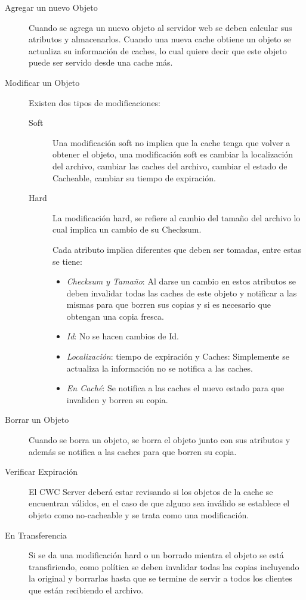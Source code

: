 \begin{description}

\item[Agregar un nuevo Objeto] Cuando se agrega un nuevo objeto al servidor web se deben calcular sus atributos y almacenarlos. Cuando una nueva cache obtiene un objeto se actualiza su información de caches, lo cual quiere decir que este objeto puede ser servido desde una cache más.

\item [Modificar un Objeto] Existen dos tipos de modificaciones: 
	\begin{description}
	\item[Soft] Una modificación soft no implica que la cache tenga que volver a obtener el objeto, una modificación soft es cambiar la localización del archivo, cambiar las caches del archivo, cambiar el estado de Cacheable, cambiar su tiempo de expiración.
	\item [Hard] La modificación hard, se refiere al cambio del tamaño del archivo lo cual implica un cambio de su Checksum.

Cada atributo implica diferentes que deben ser tomadas, entre estas se tiene:

		\begin{itemize}
		\item \textit{Checksum y Tamaño}: Al darse un cambio en estos atributos se deben invalidar todas las caches de este objeto y notificar a las mismas para que borren sus copias y si es necesario que obtengan una copia fresca.
		\item \textit{Id}: No se hacen cambios de Id.
		\item \textit{Localización}: tiempo de expiración y Caches: Simplemente se actualiza la información no se notifica a las caches.
		\item \textit{En Caché}: Se notifica a las caches el nuevo estado para que invaliden y borren su copia.
		\end{itemize}

\end{description}

\item [Borrar un Objeto] Cuando se borra un objeto, se borra el objeto junto con sus atributos y además se notifica a las caches para que borren su copia.

\item [Verificar Expiración] El CWC Server deberá estar revisando si los objetos de la cache se encuentran válidos, en el caso de que alguno sea inválido se establece el objeto como no-cacheable y se trata como una modificación. 

\item [En Transferencia] Si se da una modificación hard o un borrado mientra el objeto se está transfiriendo, como política se deben invalidar todas las copias incluyendo la original y borrarlas hasta que se termine de servir a todos los clientes que están recibiendo el archivo.

\end{description}


